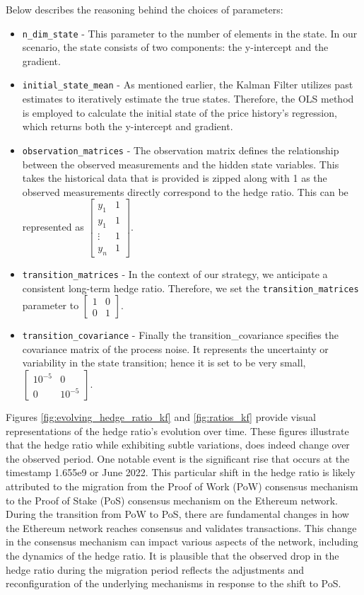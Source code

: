 \noindent Below describes the reasoning behind the choices of parameters:
\begin{itemize}
    \item \texttt{n\_dim\_state} - This parameter to the number of elements in the state. In our scenario, the state consists of two components: the y-intercept and the gradient.
    \item \texttt{initial\_state\_mean} - As mentioned earlier, the Kalman Filter utilizes past estimates to iteratively estimate the true states. Therefore, the OLS method is employed to calculate the initial state of the price history's regression, which returns both the y-intercept and gradient.
    \item \texttt{observation\_matrices} - The observation matrix defines the relationship between the observed measurements and the hidden state variables. This takes the historical data that is provided is zipped along with 1 as the observed measurements directly correspond to the hedge ratio. This can be represented as $\begin{bmatrix} y_1 & 1 \\ y_1 & 1 \\ \vdots & 1 \\ y_n & 1\end{bmatrix}$.
    \item \texttt{transition\_matrices} - In the context of our strategy, we anticipate a consistent long-term hedge ratio. Therefore, we set the \texttt{transition\_matrices} parameter to $\begin{bmatrix} 1 & 0\\ 0 & 1 \end{bmatrix}$.
    \item \texttt{transition\_covariance} - Finally the transition\_covariance specifies the covariance matrix of the process noise. It represents the uncertainty or variability in the state transition; hence it is set to be very small, $\begin{bmatrix} 10^{-5} & 0\\ 0 & 10^{-5} \end{bmatrix}$.
\end{itemize}

\noindent Figures \ref{fig:evolving_hedge_ratio_kf} and \ref{fig:ratios_kf} provide visual representations of the hedge ratio's evolution over time. These figures illustrate that the hedge ratio while exhibiting subtle variations, does indeed change over the observed period. One notable event is the significant rise that occurs at the timestamp 1.655e9 or June 2022. This particular shift in the hedge ratio is likely attributed to the migration from the Proof of Work (PoW) consensus mechanism to the Proof of Stake (PoS) consensus mechanism on the Ethereum network.
\\[3mm]
During the transition from PoW to PoS, there are fundamental changes in how the Ethereum network reaches consensus and validates transactions. This change in the consensus mechanism can impact various aspects of the network, including the dynamics of the hedge ratio. It is plausible that the observed drop in the hedge ratio during the migration period reflects the adjustments and reconfiguration of the underlying mechanisms in response to the shift to PoS.

